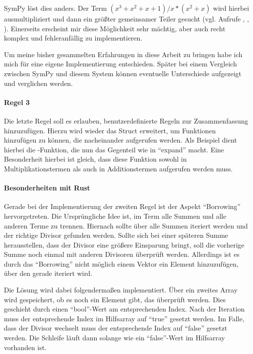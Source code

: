 \documentclass[11pt,a4paper, ngerman]{article}
\begin{document}
SymPy löst dies anders. Der Term $(x^3+x^2+x+1)/x*(x^2+x)$ wird hierbei ausmultipliziert und dann ein größter gemeinsamer Teiler gesucht (vgl. \cite{SymPySimplifySrc} Aufrufe , , ). Einerseits erscheint mir diese Möglichkeit sehr mächtig, aber auch recht komplex und fehleranfällig zu implementieren.

Um meine bisher gesammelten Erfahrungen in diese Arbeit zu bringen habe ich mich für eine eigene Implementierung entschieden. Später bei einem Vergleich zwischen SymPy und diesem System können eventuelle Unterschiede aufgezeigt und verglichen werden.

\paragraph{Regel 3} Die letzte Regel soll es erlauben, benutzerdefinierte Regeln zur Zusammenfassung hinzuzufügen. Hierzu wird wieder das Struct  erweitert, um Funktionen hinzufügen zu können, die nacheinander aufgerufen werden. Als Beispiel dient hierbei die -Funktion, die nun das Gegenteil wie in ``expand'' macht. Eine Besonderheit hierbei ist gleich, dass diese Funktion sowohl in Multiplikationstermen als auch in Additionstermen aufgerufen werden muss.

\paragraph{Besonderheiten mit Rust} Gerade bei der Implementierung der zweiten Regel ist der Aspekt ``Borrowing'' hervorgetreten. Die Ursprüngliche Idee ist, im Term alle Summen und alle anderen Terme zu trennen. Hiernach sollte über alle Summen iteriert werden und der richtige Divisor gefunden werden. Sollte sich bei einer späteren Summe herausstellen, dass der Divisor eine größere Einsparung bringt, soll die vorherige Summe noch einmal mit anderen Divisoren überprüft werden. Allerdings ist es durch das ``Borrowing'' nicht möglich einem Vektor ein Element hinzuzufügen, über den gerade iteriert wird.

Die Lösung wird dabei folgendermaßen implementiert. Über ein zweites Array wird gespeichert, ob es noch ein Element gibt, das überprüft werden. Dies geschieht durch einen ``bool''-Wert am entsprechenden Index. Nach der Iteration muss der entsprechende Index im Hilfsarray auf ``true'' gesetzt werden. Im Falle, dass der Divisor wechselt muss der entsprechende Index auf ``false'' gesetzt werden. Die Schleife läuft dann solange wie ein ``false''-Wert im Hilfsarray vorhanden ist.
\end{document}
